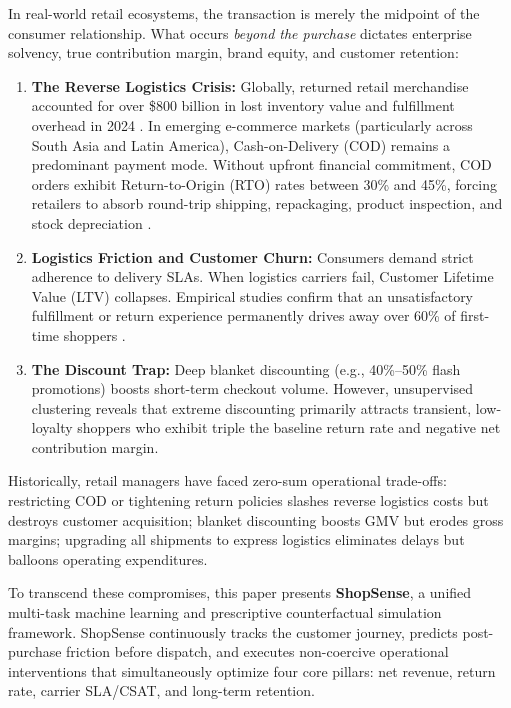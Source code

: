 \documentclass[conference]{IEEEtran}
\begin{document}
In real-world retail ecosystems, the transaction is merely the midpoint of the consumer relationship. What occurs \textit{beyond the purchase} dictates enterprise solvency, true contribution margin, brand equity, and customer retention:
\begin{enumerate}
    \item \textbf{The Reverse Logistics Crisis:} Globally, returned retail merchandise accounted for over \$800 billion in lost inventory value and fulfillment overhead in 2024 \cite{nrf2024}. In emerging e-commerce markets (particularly across South Asia and Latin America), Cash-on-Delivery (COD) remains a predominant payment mode. Without upfront financial commitment, COD orders exhibit Return-to-Origin (RTO) rates between 30\% and 45\%, forcing retailers to absorb round-trip shipping, repackaging, product inspection, and stock depreciation \cite{raman2008inventory}.
    \item \textbf{Logistics Friction and Customer Churn:} Consumers demand strict adherence to delivery SLAs. When logistics carriers fail, Customer Lifetime Value (LTV) collapses. Empirical studies confirm that an unsatisfactory fulfillment or return experience permanently drives away over 60\% of first-time shoppers \cite{rao2011failure}.
    \item \textbf{The Discount Trap:} Deep blanket discounting (e.g., 40\%--50\% flash promotions) boosts short-term checkout volume. However, unsupervised clustering reveals that extreme discounting primarily attracts transient, low-loyalty shoppers who exhibit triple the baseline return rate and negative net contribution margin.
\end{enumerate}

Historically, retail managers have faced zero-sum operational trade-offs: restricting COD or tightening return policies slashes reverse logistics costs but destroys customer acquisition; blanket discounting boosts GMV but erodes gross margins; upgrading all shipments to express logistics eliminates delays but balloons operating expenditures.

To transcend these compromises, this paper presents \textbf{ShopSense}, a unified multi-task machine learning and prescriptive counterfactual simulation framework. ShopSense continuously tracks the customer journey, predicts post-purchase friction before dispatch, and executes non-coercive operational interventions that simultaneously optimize four core pillars: net revenue, return rate, carrier SLA/CSAT, and long-term retention.
\end{document}
